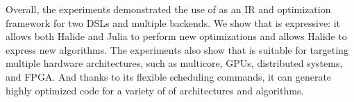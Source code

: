 Overall, the experiments demonstrated the use of \framework as an IR and optimization framework for two DSLs and multiple backends.  We show that \framework{} is expressive: it allows both Halide and Julia to perform new optimizations and allows Halide to express new algorithms.  The experiments also show that \framework{} is suitable for targeting multiple hardware architectures, such as multicore, GPUs, 
distributed systems, and FPGA. And thanks to its flexible scheduling commands, it can generate highly optimized code for a variety of of architectures and algorithms.

